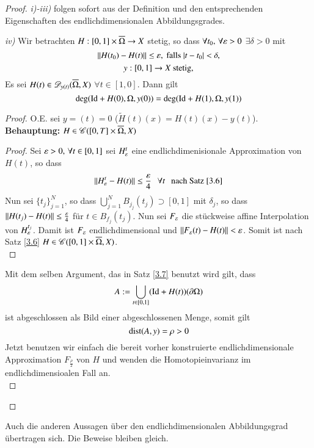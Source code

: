 \begin{proof}
    \textit{i)-iii)} folgen sofort aus der Definition und den entsprechenden Eigenschaften des
    endlichdimensionalen Abbildungsgrades.

    \noindent\textit{iv)} Wir betrachten $H:[0,1]\times \overline \Omega\rightarrow X$ stetig,
    so dass $\forall t_0,\,\forall \varepsilon>0$ $\exists \delta>0$ mit
    \[
        \|H(t_0)-H(t)\|\leq \varepsilon, \text{ falls } |t-t_0|<\delta,
    \]
    \[
        y:[0,1]\rightarrow X \text{ stetig},
    \]
    Es sei $H(t)\in \mathscr D_{y(t)}(\overline \Omega,X)$ $\forall t\in[1,0]$. Dann gilt
    \[
        \deg(\mathrm{Id}+H(0),\Omega,y(0))=\deg (\mathrm{Id} +H(1),\Omega,y(1))
    \]
    \begin{proof}
        O.E. sei $y=(t)=0$ ($\tilde H(t)(x)=H(t)(x)-y(t)$).\\
        \textbf{Behauptung:} $H\in \mathscr C([0,T]\times \overline\Omega,X)$
        \begin{proof}
            Sei $\varepsilon >0,\, \forall t\in [0,1]$ sei $H_\varepsilon^t$ eine endlichdimenisionale Approximation
            von $H(t)$, so dass
            \[
                \|H_\varepsilon^t-H(t)\|\leq\frac{\varepsilon}4 \hspace{.25cm} \forall t \hspace{.25cm} \text{nach Satz \ref{3.6}}
            \]
            Nun sei $\{t_j\}_{j=1}^N$, so dass $\bigcup _{j=1}^N B_{j_j}(t_j)\supset [0,1]$ mit $\delta_j
            $, so dass $\|H(t_j)-H(t)\|\leq \frac{\varepsilon}4$ für $t\in B_{f_j}(t_j)$. Nun sei $F_\varepsilon$ die
            stückweise affine Interpolation von $H_\varepsilon^{t_j}$. Damit ist $F_\varepsilon$ endlichdimensional und
            $\|F_\varepsilon(t)-H(t)\|<\varepsilon$. Somit ist nach Satz \ref{3.6} $H\in \mathscr C([0,1]\times 
            \overline \Omega, X)$.
            \[ \]
        \end{proof}
        Mit dem selben Argument, das in Satz \ref{3.7} benutzt wird gilt, dass
        \[
            A:=\bigcup_{t\in [0,1]} (\mathrm{Id}+H(t))(\partial \Omega)
        \]
        ist abgeschlossen als Bild einer abgeschlossenen Menge, somit gilt
        \[
            \mathrm{dist}(A,y)=\rho>0
        \]
        Jetzt benutzen wir einfach die bereit vorher konstruierte endlichdimensionale Approximation 
        $F_{\frac\rho2}$ von $H$ und wenden die Homotopieinvarianz im endlichdimensioalen Fall an.
        \[ \]
    \end{proof}
    \[ \]
\end{proof}

Auch die anderen Aussagen über den endlichdimensionalen Abbildungsgrad übertragen sich.
Die Beweise bleiben gleich.

